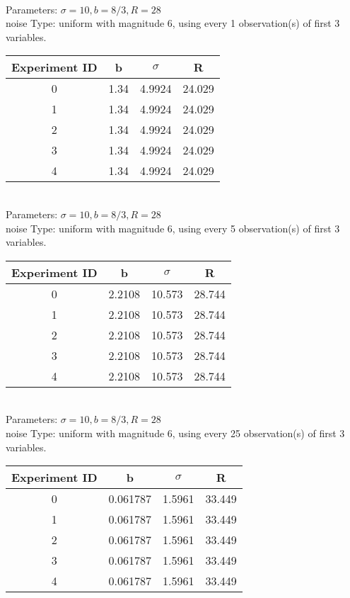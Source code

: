\begin{multicols}{3}
\begin{tabular}{cccc}
 \end{tabular}\\
Parameters: $\sigma=10, b=8/3, R=28$\\
noise Type: uniform with magnitude 6, using every 1 observation(s) of first 3 variables.\\
\begin{tabular}{cccc}
\hline Experiment ID & b & $\sigma$ & R \\ \hline 
0 & 1.34 & 4.9924 & 24.029\\ \hline 
 1 & 1.34 & 4.9924 & 24.029\\ \hline 
 2 & 1.34 & 4.9924 & 24.029\\ \hline 
 3 & 1.34 & 4.9924 & 24.029\\ \hline 
 4 & 1.34 & 4.9924 & 24.029\\ \hline 
 \end{tabular}\\
Parameters: $\sigma=10, b=8/3, R=28$\\
noise Type: uniform with magnitude 6, using every 5 observation(s) of first 3 variables.\\
\begin{tabular}{cccc}
\hline Experiment ID & b & $\sigma$ & R \\ \hline 
0 & 2.2108 & 10.573 & 28.744\\ \hline 
 1 & 2.2108 & 10.573 & 28.744\\ \hline 
 2 & 2.2108 & 10.573 & 28.744\\ \hline 
 3 & 2.2108 & 10.573 & 28.744\\ \hline 
 4 & 2.2108 & 10.573 & 28.744\\ \hline 
 \end{tabular}\\
Parameters: $\sigma=10, b=8/3, R=28$\\
noise Type: uniform with magnitude 6, using every 25 observation(s) of first 3 variables.\\
\begin{tabular}{cccc}
\hline Experiment ID & b & $\sigma$ & R \\ \hline 
0 & 0.061787 & 1.5961 & 33.449\\ \hline 
 1 & 0.061787 & 1.5961 & 33.449\\ \hline 
 2 & 0.061787 & 1.5961 & 33.449\\ \hline 
 3 & 0.061787 & 1.5961 & 33.449\\ \hline 
 4 & 0.061787 & 1.5961 & 33.449\\ \hline 
 \end{tabular}\\

\end{multicols}
